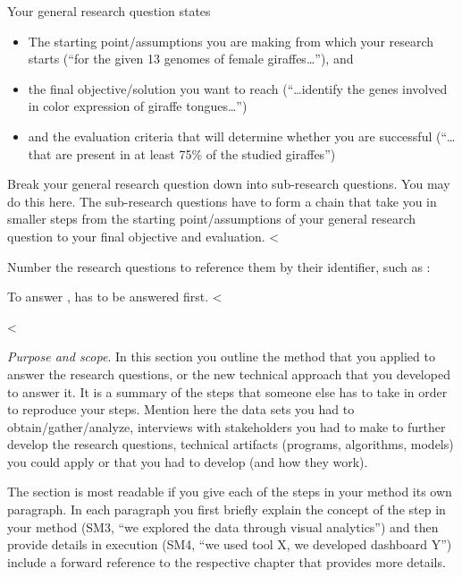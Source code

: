 {{{Your general research question states
\begin{itemize}
  \item The starting point/assumptions you are making from which your research starts (``for the given 13 genomes of female giraffes\ldots''), and
  \item the final objective/solution you want to reach (``\ldots{}identify the genes involved in color expression of giraffe tongues\ldots'')
  \item and the evaluation criteria that will determine whether you are successful (``\ldots{}that are present in at least 75\% of the studied giraffes'')
\end{itemize}

Break your general research question down into sub-research questions.
You may do this here.
The sub-research questions have to form a chain that take you in smaller steps from the starting point/assumptions of your general research question to your final objective and evaluation.
<%

Number the research questions to reference them by their identifier, such as :



To answer ,  has to be answered first.
<%

<%

\emph{Purpose and scope}.
In this section you outline the method that you applied to answer the research questions, or the new technical approach that you developed to answer it.
It is a summary of the steps that someone else has to take in order to reproduce your steps.
Mention here the data sets you had to obtain/gather/analyze, interviews with stakeholders you had to make to further develop the research questions, technical artifacts (programs, algorithms, models) you could apply or that you had to develop (and how they work).

The section is most readable if you give each of the steps in your method its own paragraph.
In each paragraph you first briefly explain the concept of the step in your method (SM3, ``we explored the data through visual analytics'') and then provide details in execution (SM4, ``we used tool X, we developed dashboard Y'') include a forward reference to the respective chapter that provides more details.

}}}
